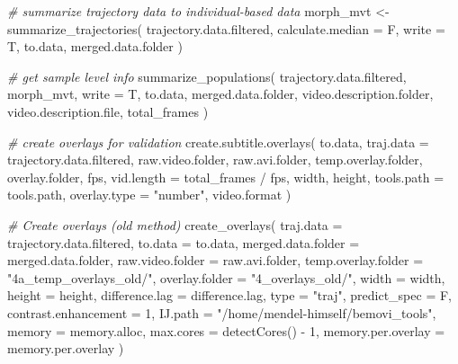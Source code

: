 \documentclass[
]{article}
\newenvironment{Shaded}{\begin{snugshade}}{\end{snugshade}}
\newcommand{\AttributeTok}[1]{\textcolor[rgb]{0.77,0.63,0.00}{#1}}
\newcommand{\CommentTok}[1]{\textcolor[rgb]{0.56,0.35,0.01}{\textit{#1}}}
\newcommand{\DecValTok}[1]{\textcolor[rgb]{0.00,0.00,0.81}{#1}}
\newcommand{\FunctionTok}[1]{\textcolor[rgb]{0.00,0.00,0.00}{#1}}
\newcommand{\NormalTok}[1]{#1}
\newcommand{\OtherTok}[1]{\textcolor[rgb]{0.56,0.35,0.01}{#1}}
\newcommand{\SpecialCharTok}[1]{\textcolor[rgb]{0.00,0.00,0.00}{#1}}
\newcommand{\StringTok}[1]{\textcolor[rgb]{0.31,0.60,0.02}{#1}}
\begin{document}
\begin{Shaded}
\begin{Highlighting}[]
\CommentTok{\# summarize trajectory data to individual{-}based data}
\NormalTok{morph\_mvt }\OtherTok{\textless{}{-}}
  \FunctionTok{summarize\_trajectories}\NormalTok{(}
\NormalTok{    trajectory.data.filtered,}
    \AttributeTok{calculate.median =}\NormalTok{ F,}
    \AttributeTok{write =}\NormalTok{ T,}
\NormalTok{    to.data,}
\NormalTok{    merged.data.folder}
\NormalTok{  )}

\CommentTok{\# get sample level info}
\FunctionTok{summarize\_populations}\NormalTok{(}
\NormalTok{  trajectory.data.filtered,}
\NormalTok{  morph\_mvt,}
  \AttributeTok{write =}\NormalTok{ T,}
\NormalTok{  to.data,}
\NormalTok{  merged.data.folder,}
\NormalTok{  video.description.folder,}
\NormalTok{  video.description.file,}
\NormalTok{  total\_frames}
\NormalTok{)}

\CommentTok{\# create overlays for validation}
\FunctionTok{create.subtitle.overlays}\NormalTok{(}
\NormalTok{  to.data,}
  \AttributeTok{traj.data =}\NormalTok{ trajectory.data.filtered,}
\NormalTok{  raw.video.folder,}
\NormalTok{  raw.avi.folder,}
\NormalTok{  temp.overlay.folder,}
\NormalTok{  overlay.folder,}
\NormalTok{  fps,}
  \AttributeTok{vid.length =}\NormalTok{ total\_frames }\SpecialCharTok{/}\NormalTok{ fps,}
\NormalTok{  width,}
\NormalTok{  height,}
  \AttributeTok{tools.path =}\NormalTok{ tools.path,}
  \AttributeTok{overlay.type =} \StringTok{"number"}\NormalTok{,}
\NormalTok{  video.format}
\NormalTok{)}

\CommentTok{\# Create overlays (old method)}
\FunctionTok{create\_overlays}\NormalTok{(}
  \AttributeTok{traj.data =}\NormalTok{ trajectory.data.filtered,}
  \AttributeTok{to.data =}\NormalTok{ to.data,}
  \AttributeTok{merged.data.folder =}\NormalTok{ merged.data.folder,}
  \AttributeTok{raw.video.folder =}\NormalTok{ raw.avi.folder,}
  \AttributeTok{temp.overlay.folder =} \StringTok{"4a\_temp\_overlays\_old/"}\NormalTok{,}
  \AttributeTok{overlay.folder =} \StringTok{"4\_overlays\_old/"}\NormalTok{,}
  \AttributeTok{width =}\NormalTok{ width,}
  \AttributeTok{height =}\NormalTok{ height,}
  \AttributeTok{difference.lag =}\NormalTok{ difference.lag,}
  \AttributeTok{type =} \StringTok{"traj"}\NormalTok{,}
  \AttributeTok{predict\_spec =}\NormalTok{ F,}
  \AttributeTok{contrast.enhancement =} \DecValTok{1}\NormalTok{,}
  \AttributeTok{IJ.path =} \StringTok{"/home/mendel{-}himself/bemovi\_tools"}\NormalTok{,}
  \AttributeTok{memory =}\NormalTok{ memory.alloc,}
  \AttributeTok{max.cores =} \FunctionTok{detectCores}\NormalTok{() }\SpecialCharTok{{-}} \DecValTok{1}\NormalTok{,}
  \AttributeTok{memory.per.overlay =}\NormalTok{ memory.per.overlay}
\NormalTok{)}


\end{Highlighting}
\end{Shaded}
\end{document}
